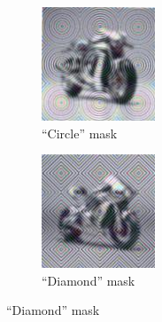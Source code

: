 \documentclass[a4paper, oneside]{discothesis}
\begin{document}
\begin{figure}[th]
	\begin{subfigure}[t]{0.19\textwidth}\centering\includegraphics[width=\linewidth]{figures/hcaptcha-circle.png}\caption{``Circle'' mask}\label{fig:subfig1}\end{subfigure}
	\hfill
	\begin{subfigure}[t]{0.19\textwidth}\centering\includegraphics[width=\linewidth]{figures/hcaptcha-diamond.png}\caption{``Diamond'' mask}\label{fig:subfig2}\end{subfigure}

\end{figure}
\end{document}

